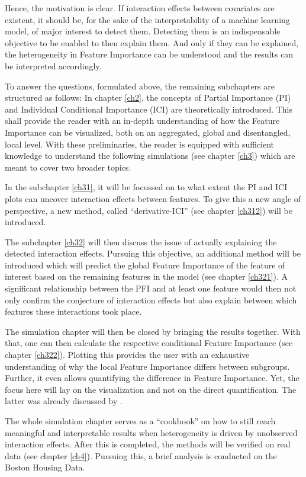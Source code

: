 \documentclass[
]{krantz}
\begin{document}
Hence, the motivation is clear. If interaction effects between covariates are existent, it should be, for the sake of the interpretability of a machine learning model, of major interest to detect them. Detecting them is an indispensable objective to be enabled to then explain them. And only if they can be explained, the heterogeneity in Feature Importance can be understood and the results can be interpreted accordingly.

To answer the questions, formulated above, the remaining subchapters are structured as follows: In chapter \ref{ch2}, the concepts of Partial Importance (PI) and Individual Conditional Importance (ICI) are theoretically introduced. This shall provide the reader with an in-depth understanding of how the Feature Importance can be visualized, both on an aggregated, global and disentangled, local level. With these preliminaries, the reader is equipped with sufficient knowledge to understand the following simulations (see chapter \ref{ch3}) which are meant to cover two broader topics.

In the subchapter \ref{ch31}, it will be focussed on to what extent the PI and ICI plots can uncover interaction effects between features. To give this a new angle of perspective, a new method, called ``derivative-ICI'' (see chapter \ref{ch312}) will be introduced.

The subchapter \ref{ch32} will then discuss the issue of actually explaining the detected interaction effects. Pursuing this objective, an additional method will be introduced which will predict the global Feature Importance of the feature of interest based on the remaining features in the model (see chapter \ref{ch321}). A significant relationship between the PFI and at least one feature would then not only confirm the conjecture of interaction effects but also explain between which features these interactions took place.

The simulation chapter will then be closed by bringing the results together. With that, one can then calculate the respective conditional Feature Importance (see chapter \ref{ch322}). Plotting this provides the user with an exhaustive understanding of why the local Feature Importance differs between subgroups. Further, it even allows quantifying the difference in Feature Importance. Yet, the focus here will lay on the visualization and not on the direct quantification. The latter was already discussed by \citet{casalicchio2018visualizing}.

The whole simulation chapter serves as a ``cookbook'' on how to still reach meaningful and interpretable results when heterogeneity is driven by unobserved interaction effects. After this is completed, the methods will be verified on real data (see chapter \ref{ch4}). Pursuing this, a brief analysis is conducted on the Boston Housing Data.
\end{document}
